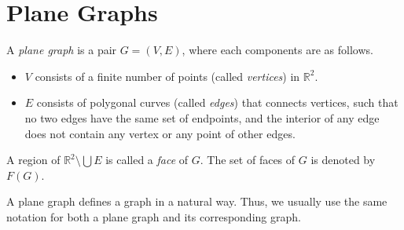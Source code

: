 \section{Plane Graphs}
\begin{definition}
  A \emph{plane graph} is a pair $G = (V, E)$, where each components are as
  follows.
  \begin{itemize}
    \item $V$ consists of a finite number of points (called \emph{vertices}) in
    $\mathbb{R}^2$.
    \item $E$ consists of polygonal curves (called \emph{edges})
    that connects vertices, such that no two edges have the same set of
    endpoints, and the interior of any edge does not contain any vertex or any
    point of other edges.
  \end{itemize}
  A region of $\mathbb{R}^2 \setminus \bigcup E$ is called a \emph{face} of
  $G$.
  The set of faces of $G$ is denoted by $F(G)$.
\end{definition}
\begin{remark}
  A plane graph defines a graph in a natural way.
  Thus, we usually use the same notation for both a plane graph and its
  corresponding graph.
\end{remark}